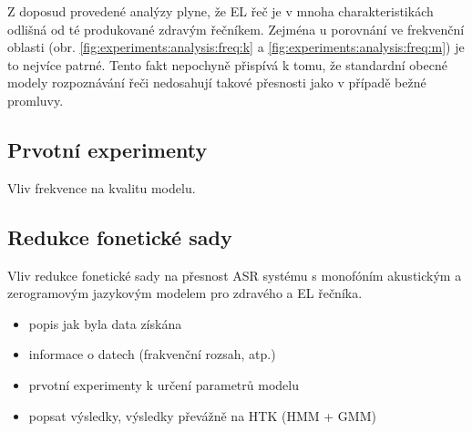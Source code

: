Z doposud provedené analýzy plyne, že EL řeč je v mnoha charakteristikách odlišná od té produkované zdravým řečníkem. Zejména u porovnání ve frekvenční oblasti (obr. \ref{fig:experiments:analysis:freq:k} a \ref{fig:experiments:analysis:freq:m}) je to nejvíce patrné. Tento fakt nepochyně přispívá k tomu, že standardní obecné modely rozpoznávání řeči nedosahují takové přesnosti jako v případě bežné promluvy.


\subsection{Prvotní experimenty}

\begin{table}[htpb]
  \centering
  \def\arraystretch{1.5}
  \caption{Vliv frekvence na kvalitu modelu.}
\end{table}

\subsection{Redukce fonetické sady}

\begin{table}[htpb]
  \centering
  \def\arraystretch{1.5}
  \caption{Vliv redukce fonetické sady na přesnost ASR systému s monofóním akustickým a zerogramovým jazykovým modelem pro zdravého a EL řečníka.}
\end{table}

\begin{itemize}
  \item popis jak byla data získána
  \item informace o datech (frakvenční rozsah, atp.)
  \item prvotní experimenty k určení parametrů modelu
  \item popsat výsledky, výsledky převážně na HTK (HMM + GMM)
\end{itemize}
